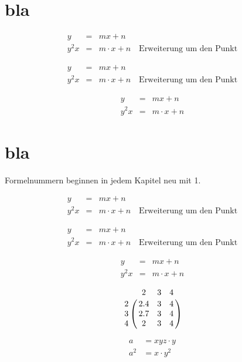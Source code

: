 \documentclass[12pt,ngerman,parskip=full]{scrbook}
\begin{document}
\chapter{bla}

\begin{eqnarray}
	y &=& mx + n \\
	y^2x &=& m \cdot x + n 	\quad \text{Erweiterung um den Punkt}
\end{eqnarray}

\blindtext

\begin{eqnarray}
	y &=& mx + n \\
	y^2x &=& m \cdot x + n 	\quad \text{Erweiterung um den Punkt}
\end{eqnarray}

\[
\begin{array}{rcl}
	y &=& mx + n \\
	y^2x &=& m \cdot x + n 	
\end{array}
\]


\chapter{bla}

Formelnummern beginnen in jedem Kapitel neu mit 1.

\begin{eqnarray}
	y &=& mx + n \\
	y^2x &=& m \cdot x + n 	\quad \text{Erweiterung um den Punkt}
\end{eqnarray}

\blindtext

\begin{eqnarray}
	y &=& mx + n \\
	y^2x &=& m \cdot x + n 	\quad \text{Erweiterung um den Punkt}
\end{eqnarray}

\[
\begin{array}{rcl}
	y &=& mx + n \\
	y^2x &=& m \cdot x + n 	
\end{array}
\]

\[
\bordermatrix{
 & 2 & 3 & 4 \cr
2 & 2.4 & 3 & 4 \cr 
3 & 2.7 & 3 & 4 \cr
4 & 2 & 3 & 4 \cr
}
\]


\begin{align} %
a &= xyz \cdot y \\
a^2 &= x \cdot y^2 
\end{align}
\end{document}
